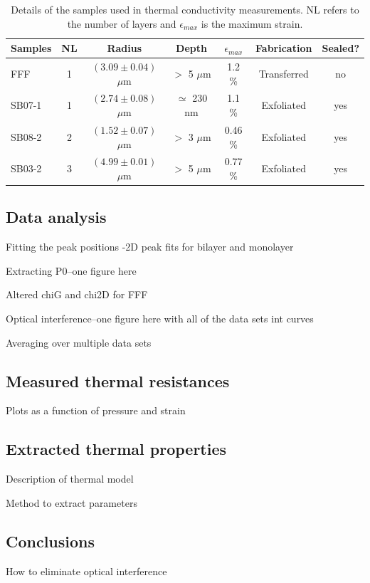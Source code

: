 \begin{table}
	\begin{center}
	\begin{tabular}{l c c c c c c}
		\hline
		\hline
		Samples & NL 	& Radius 					& Depth 		& $\epsilon_{max}$ & Fabrication 		& Sealed? \\
		\hline
		FFF		& 1 	& $(3.09 \pm 0.04)$ $\mu$m 	& $>$ 5 $\mu$m 	& 1.2 \%	& Transferred 	 	& no \\
		SB07-1	& 1 	& $(2.74 \pm 0.08)$ $\mu$m 	& $\simeq$ 230 nm & 1.1 \%	& Exfoliated 		& yes \\
		SB08-2	& 2 	& $(1.52 \pm 0.07)$ $\mu$m 	& $>$ 3 $\mu$m 	& 0.46 \%	& Exfoliated 		& yes \\
		SB03-2	& 3 	& $(4.99 \pm 0.01)$ $\mu$m 	& $>$ 5 $\mu$m 	& 0.77 \%	& Exfoliated 		& yes \\
		\hline
		\hline
	\end{tabular}
	\end{center}
	\caption[Samples used in thermal conductivity measurements]{\label{tab:therm:samples} Details of the samples used in thermal conductivity measurements. NL refers to the number of layers and $\epsilon_{max}$ is the maximum strain.}
\end{table}

\subsection{Data analysis}
Fitting the peak positions
-2D peak fits for bilayer and monolayer

Extracting P0--one figure here

Altered chiG and chi2D for FFF

Optical interference--one figure here with all of the data sets int curves

Averaging over multiple data sets

\subsection{Measured thermal resistances}
Plots as a function of pressure and strain

\subsection{Extracted thermal properties}
Description of thermal model

Method to extract parameters

\subsection{Conclusions}
How to eliminate optical interference